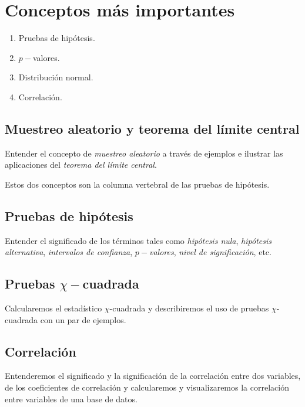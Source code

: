 \section{Conceptos más importantes}

\begin{enumerate}
\item Pruebas de hipótesis.
\item $p-$valores.
\item Distribución normal.
\item Correlación.
\end{enumerate}


\subsection{Muestreo aleatorio y teorema del límite central}
Entender el concepto de \emph{muestreo aleatorio} a través de ejemplos e ilustrar las aplicaciones del \emph{teorema del límite central}. 

  Estos dos conceptos son la columna vertebral de las pruebas de hipótesis.


\subsection{Pruebas de hipótesis}
Entender el significado de los términos tales como \emph{hipótesis nula}, \emph{hipótesis alternativa}, \emph{intervalos de confianza}, \emph{$p-$valores}, \emph{nivel de significación}, etc.

\subsection{Pruebas $\chi-$cuadrada}
Calcularemos el estadístico $\chi$-cuadrada y describiremos el uso de pruebas $\chi$-cuadrada con un par de ejemplos.

 \subsection{Correlación}
  Entenderemos el significado y la significación de la correlación entre dos variables, de los coeficientes de correlación y calcularemos y visualizaremos la correlación entre variables de una base de datos.
 

